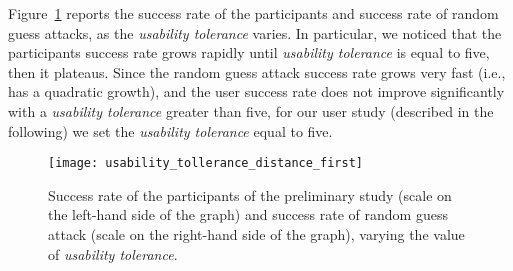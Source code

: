 \documentclass[conference]{IEEEtran}
\begin{document}
Figure~\ref{fig:usability_tollerance_first} reports the success rate of the participants and success rate of random guess attacks, as the \textit{usability tolerance} varies.
In particular, we noticed that the participants success rate grows rapidly until \textit{usability tolerance} is equal to five, then it plateaus.
Since the random guess attack success rate grows very fast (i.e., has a quadratic growth), and the user success rate does not improve significantly with a \textit{usability tolerance} greater than five, for our user study (described in the following) we set the \textit{usability tolerance} equal to five.

\begin{figure}[t]
\centering
\texttt{[image: usability\_tollerance\_distance\_first]}\caption{Success rate of the participants of the preliminary study (scale on the left-hand side of the graph) and success rate of random guess attack (scale on the right-hand side of the graph), varying the value of \textit{usability tolerance}.}
\label{fig:usability_tollerance_first}
\end{figure}
\end{document}
